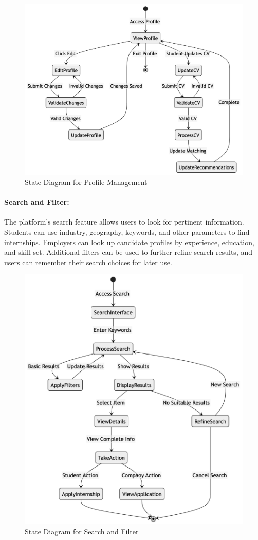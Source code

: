 \begin{figure}[H]
    \begin{center}
        \includegraphics[width=0.8\linewidth]{JhaBhatiaSharma/Images/State Diagrams/ProfileManagement.png}
        \caption{State Diagram for Profile Management}
        \label{fig:ProfileManagement}%
    \end{center}
\end{figure}

\paragraph{Search and Filter:}
The platform's search feature allows users to look for pertinent information. Students can use industry, geography, keywords, and other parameters to find internships. Employers can look up candidate profiles by experience, education, and skill set. Additional filters can be used to further refine search results, and users can remember their search choices for later use.


\begin{figure}[H]
    \begin{center}
        \includegraphics[width=0.6\linewidth]{JhaBhatiaSharma/Images/State Diagrams/SearchandFilter.png}
        \caption{State Diagram for Search and Filter}
        \label{fig:SearchFilter}%
    \end{center}
\end{figure}

